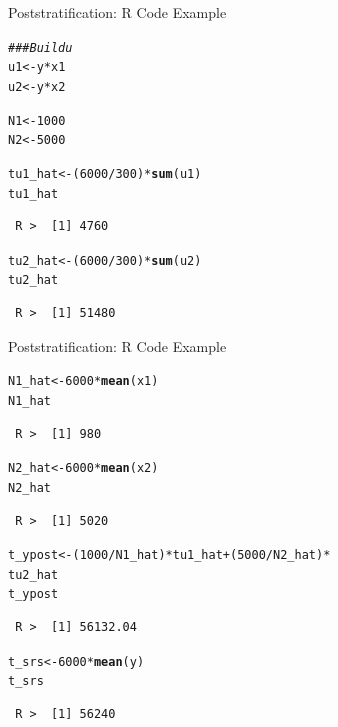 \documentclass[10pt]{beamer}\usepackage[]{graphicx}\usepackage[]{xcolor}
\makeatletter
\newcommand{\hlnum}[1]{\textcolor[rgb]{0.686,0.059,0.569}{#1}}%
\newcommand{\hlcom}[1]{\textcolor[rgb]{0.678,0.584,0.686}{\textit{#1}}}%
\newcommand{\hlopt}[1]{\textcolor[rgb]{0,0,0}{#1}}%
\newcommand{\hlstd}[1]{\textcolor[rgb]{0.345,0.345,0.345}{#1}}%
\newcommand{\hlkwb}[1]{\textcolor[rgb]{0.69,0.353,0.396}{#1}}%
\newcommand{\hlkwd}[1]{\textcolor[rgb]{0.737,0.353,0.396}{\textbf{#1}}}%
\newenvironment{kframe}{%
 \def\at@end@of@kframe{}%
 \ifinner\ifhmode%
  \def\at@end@of@kframe{\end{minipage}}%
  \begin{minipage}{\columnwidth}%
 \fi\fi%
 \def\FrameCommand##1{\hskip\@totalleftmargin \hskip-\fboxsep
 \colorbox{shadecolor}{##1}\hskip-\fboxsep
     \hskip-\linewidth \hskip-\@totalleftmargin \hskip\columnwidth}%
 \MakeFramed {\advance\hsize-\width
   \@totalleftmargin\z@ \linewidth\hsize
   \@setminipage}}%
 {\par\unskip\endMakeFramed%
 \at@end@of@kframe}
\newenvironment{knitrout}{}{} %
\makeatother
\begin{document}
\begin{frame}[containsverbatim]{Poststratification: R Code Example}
\small
\begin{knitrout}
\color{fgcolor}\begin{kframe}
\begin{alltt}
\hlcom{### Build u}
\hlstd{u1} \hlkwb{<-} \hlstd{y} \hlopt{*} \hlstd{x1}
\hlstd{u2} \hlkwb{<-} \hlstd{y} \hlopt{*} \hlstd{x2}

\hlstd{N1} \hlkwb{<-} \hlnum{1000}
\hlstd{N2} \hlkwb{<-} \hlnum{5000}

\hlstd{tu1_hat} \hlkwb{<-} \hlstd{(}\hlnum{6000}\hlopt{/}\hlnum{300}\hlstd{)} \hlopt{*} \hlkwd{sum}\hlstd{(u1)}
\hlstd{tu1_hat}
\end{alltt}
\begin{verbatim}
 R >  [1] 4760
\end{verbatim}
\begin{alltt}
\hlstd{tu2_hat} \hlkwb{<-} \hlstd{(}\hlnum{6000}\hlopt{/}\hlnum{300}\hlstd{)} \hlopt{*} \hlkwd{sum}\hlstd{(u2)}
\hlstd{tu2_hat}
\end{alltt}
\begin{verbatim}
 R >  [1] 51480
\end{verbatim}
\end{kframe}
\end{knitrout}
\end{frame}


\begin{frame}[containsverbatim]{Poststratification: R Code Example}
\small
\begin{knitrout}
\color{fgcolor}\begin{kframe}
\begin{alltt}
\hlstd{N1_hat} \hlkwb{<-} \hlnum{6000} \hlopt{*} \hlkwd{mean}\hlstd{(x1)}
\hlstd{N1_hat}
\end{alltt}
\begin{verbatim}
 R >  [1] 980
\end{verbatim}
\begin{alltt}
\hlstd{N2_hat} \hlkwb{<-} \hlnum{6000} \hlopt{*} \hlkwd{mean}\hlstd{(x2)}
\hlstd{N2_hat}
\end{alltt}
\begin{verbatim}
 R >  [1] 5020
\end{verbatim}
\begin{alltt}
\hlstd{t_ypost} \hlkwb{<-} \hlstd{(}\hlnum{1000}\hlopt{/}\hlstd{N1_hat)} \hlopt{*} \hlstd{tu1_hat} \hlopt{+} \hlstd{(}\hlnum{5000}\hlopt{/}\hlstd{N2_hat)} \hlopt{*}
    \hlstd{tu2_hat}
\hlstd{t_ypost}
\end{alltt}
\begin{verbatim}
 R >  [1] 56132.04
\end{verbatim}
\begin{alltt}
\hlstd{t_srs} \hlkwb{<-} \hlnum{6000} \hlopt{*} \hlkwd{mean}\hlstd{(y)}
\hlstd{t_srs}
\end{alltt}
\begin{verbatim}
 R >  [1] 56240
\end{verbatim}
\end{kframe}
\end{knitrout}
\end{frame}
\end{document}

